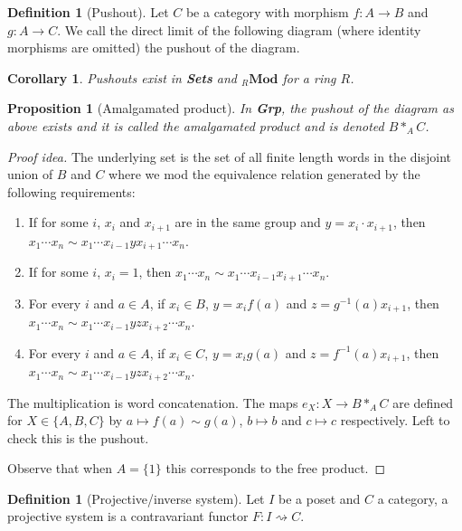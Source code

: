 \documentclass[paper=a4, fontsize=12pt]{scrartcl} %
\newtheorem{cor}[thm]{Corollary}
\newtheorem{prop}[thm]{Proposition}
\theoremstyle{definition}
\newtheorem{defn}[thm]{Definition}
\theoremstyle{remark}
\begin{document}
\begin{defn}[Pushout]
	Let $C$ be a category with morphism $f:A\rightarrow B$ and $g:A \rightarrow C$. We call the direct limit of the following diagram (where identity morphisms are omitted) the pushout of the diagram.
	\begin{figure}[H]
		\centering
	\end{figure}
\end{defn}
\begin{cor}
	Pushouts exist in \textbf{Sets} and ${}_R\textbf{Mod}$ for a ring $R$.
\end{cor}
\begin{prop}[Amalgamated product]
	In \textbf{Grp}, the pushout of the diagram as above exists and it is called the amalgamated product and is denoted $B \ast_A C$.
\end{prop}
\begin{proof}[Proof idea]
	The underlying set is the set of all finite length words in the disjoint union of $B$ and $C$ where we mod the equivalence relation generated by the following requirements: 
	\begin{enumerate}
		\item If for some $i$, $x_i$ and $x_{i+1}$ are in the same group and $y = x_i\cdot x_{i+1}$, then $x_1 \cdots x_n \sim x_1\cdots x_{i-1}yx_{i+1}\cdots x_n$.
		\item If for some $i$, $x_i = 1$, then $x_1\cdots x_n \sim x_1\cdots x_{i-1}x_{i+1}\cdots x_n$.
		\item For every $i$ and $a \in A$, if $x_i \in B$, $y = x_if(a)$ and $z = g^{-1}(a)x_{i+1}$, then $x_1\cdots x_n \sim x_1\cdots x_{i-1}yzx_{i+2}\cdots x_n$.
		\item For every $i$ and $a \in A$, if $x_i \in C$, $y = x_ig(a)$ and $z = f^{-1}(a)x_{i+1}$, then $x_1\cdots x_n \sim x_1\cdots x_{i-1}yzx_{i+2}\cdots x_n$.
	\end{enumerate}
	The multiplication is word concatenation. The maps $e_X: X\rightarrow B\ast_A C$ are defined for $X \in \{A,B,C\}$ by $a \mapsto f(a) \sim g(a)$, $b\mapsto b$ and $c \mapsto c$ respectively. Left to check this is the pushout.
	
	Observe that when $A = \{1\}$ this corresponds to the free product.
\end{proof}
\begin{defn}[Projective/inverse system]
	Let $I$ be a poset and $C$ a category, a projective system is a contravariant functor $F:I \rightsquigarrow C$.
\end{defn}
\end{document}
